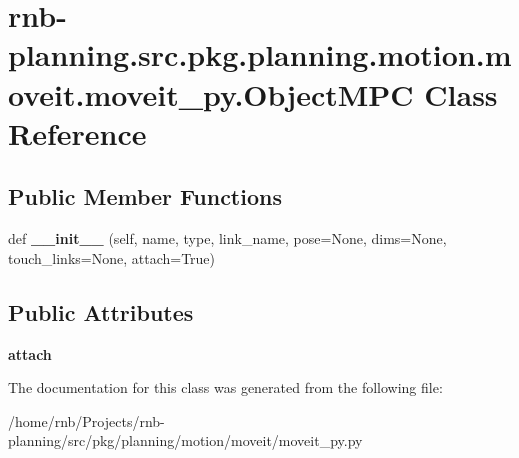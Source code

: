 \hypertarget{classrnb-planning_1_1src_1_1pkg_1_1planning_1_1motion_1_1moveit_1_1moveit__py_1_1_object_m_p_c}{}\section{rnb-\/planning.src.\+pkg.\+planning.\+motion.\+moveit.\+moveit\+\_\+py.\+Object\+M\+PC Class Reference}
\label{classrnb-planning_1_1src_1_1pkg_1_1planning_1_1motion_1_1moveit_1_1moveit__py_1_1_object_m_p_c}
\subsection*{Public Member Functions}
\begin{DoxyCompactItemize}
\item 
\mbox{\label{classrnb-planning_1_1src_1_1pkg_1_1planning_1_1motion_1_1moveit_1_1moveit__py_1_1_object_m_p_c_aef3d58b0a2deb174025f44c7a4c17ef9}} 
def {\bfseries \+\_\+\+\_\+init\+\_\+\+\_\+} (self, name, type, link\+\_\+name, pose=None, dims=None, touch\+\_\+links=None, attach=True)
\end{DoxyCompactItemize}
\subsection*{Public Attributes}
\begin{DoxyCompactItemize}
\item 
\mbox{\label{classrnb-planning_1_1src_1_1pkg_1_1planning_1_1motion_1_1moveit_1_1moveit__py_1_1_object_m_p_c_a1ee12c537a05803123ff81d32c1d484a}} 
{\bfseries attach}
\end{DoxyCompactItemize}


The documentation for this class was generated from the following file\+:\begin{DoxyCompactItemize}
\item 
/home/rnb/\+Projects/rnb-\/planning/src/pkg/planning/motion/moveit/moveit\+\_\+py.\+py\end{DoxyCompactItemize}
